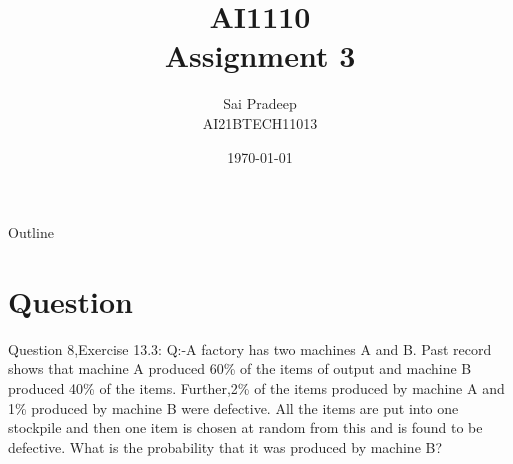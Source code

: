 \documentclass{beamer}
\title{AI1110 \\ Assignment 3}
\author{Sai Pradeep \\ AI21BTECH11013}
\date{\today}
\begin{document}
	\begin{frame}
		\titlepage
	\end{frame}
	
	\begin{frame}{Outline}
		\tableofcontents
	\end{frame}
	
	\section{Question}
	\begin{frame}{Question 8,Exercise 13.3:}
	Q:-A factory has two machines A and B. Past record shows that machine A produced 60\% of the items of output and machine B produced 40\% of the items. Further,2\% of the items produced by machine A and 1\% produced by machine B were defective. All the items are put into one stockpile and then one item is chosen at random from this and is found to be defective. What is the probability that it was produced by machine B? \\
	
	\end{frame}
	
\end{document}
